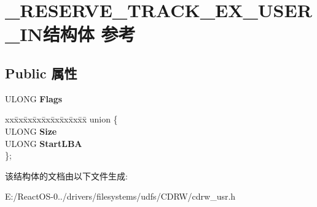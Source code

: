 \hypertarget{struct___r_e_s_e_r_v_e___t_r_a_c_k___e_x___u_s_e_r___i_n}{}\section{\+\_\+\+R\+E\+S\+E\+R\+V\+E\+\_\+\+T\+R\+A\+C\+K\+\_\+\+E\+X\+\_\+\+U\+S\+E\+R\+\_\+\+I\+N结构体 参考}
\label{struct___r_e_s_e_r_v_e___t_r_a_c_k___e_x___u_s_e_r___i_n}
\subsection*{Public 属性}
\begin{DoxyCompactItemize}
\item 
\mbox{\label{struct___r_e_s_e_r_v_e___t_r_a_c_k___e_x___u_s_e_r___i_n_aef6656bb5cf8341e149b2e274d4a4bc6}} 
U\+L\+O\+NG {\bfseries Flags}
\item 
\mbox{\label{struct___r_e_s_e_r_v_e___t_r_a_c_k___e_x___u_s_e_r___i_n_a1f6fd516d1609be60c1f697487e55093}} 
\begin{tabbing}
xx\=xx\=xx\=xx\=xx\=xx\=xx\=xx\=xx\=\kill
union \{\\
\>ULONG {\bfseries Size}\\
\>ULONG {\bfseries StartLBA}\\
\}; \\

\end{tabbing}\end{DoxyCompactItemize}


该结构体的文档由以下文件生成\+:\begin{DoxyCompactItemize}
\item 
E\+:/\+React\+O\+S-\/0../drivers/filesystems/udfs/\+C\+D\+R\+W/cdrw\+\_\+usr.\+h\end{DoxyCompactItemize}
